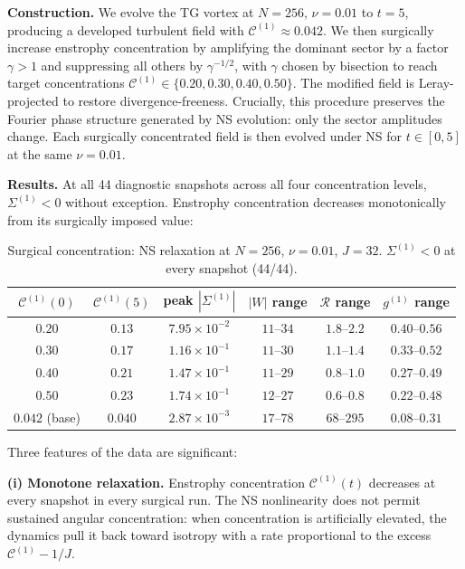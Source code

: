 \documentclass[11pt]{article}
\theoremstyle{definition}
\newcommand{\cC}{\mathcal{C}}
\begin{document}
\medskip\noindent\textbf{Construction.}
We evolve the TG vortex at $N=256$, $\nu=0.01$ to
$t=5$, producing a developed turbulent field with
$\cC^{(1)}\approx 0.042$.  We then surgically
increase enstrophy concentration by amplifying the
dominant sector by a factor $\gamma>1$ and suppressing
all others by $\gamma^{-1/2}$, with $\gamma$ chosen
by bisection to reach target concentrations
$\cC^{(1)}\in\{0.20, 0.30, 0.40, 0.50\}$.  The
modified field is Leray-projected to restore
divergence-freeness.  Crucially, this procedure
preserves the Fourier phase structure generated by
NS evolution: only the sector amplitudes change.
Each surgically concentrated field is then evolved
under NS for $t\in[0,5]$ at the same $\nu=0.01$.

\medskip\noindent\textbf{Results.}
At all 44 diagnostic snapshots across all four
concentration levels, $\Sigma^{(1)}<0$ without
exception.  Enstrophy concentration decreases
monotonically from its surgically imposed value:

\begin{table}[h]
\centering
\caption{Surgical concentration: NS relaxation at
$N=256$, $\nu=0.01$, $J=32$.  $\Sigma^{(1)}<0$ at
every snapshot (44/44).}
\label{tab:surgical}
\begin{tabular}{@{}cccccc@{}}
\toprule
$\cC^{(1)}(0)$ & $\cC^{(1)}(5)$
  & peak $|\Sigma^{(1)}|$
  & $|W|$ range
  & $\mathcal{R}$ range
  & $g^{(1)}$ range \\
\midrule
$0.20$ & $0.13$ & $7.95\times 10^{-2}$
  & $11$--$34$ & $1.8$--$2.2$ & $0.40$--$0.56$ \\
$0.30$ & $0.17$ & $1.16\times 10^{-1}$
  & $11$--$30$ & $1.1$--$1.4$ & $0.33$--$0.52$ \\
$0.40$ & $0.21$ & $1.47\times 10^{-1}$
  & $11$--$29$ & $0.8$--$1.0$ & $0.27$--$0.49$ \\
$0.50$ & $0.23$ & $1.74\times 10^{-1}$
  & $12$--$27$ & $0.6$--$0.8$ & $0.22$--$0.48$ \\
\midrule
$0.042$ (base) & $0.040$ & $2.87\times 10^{-3}$
  & $17$--$78$ & $68$--$295$ & $0.08$--$0.31$ \\
\bottomrule
\end{tabular}
\end{table}

Three features of the data are significant:

\medskip\noindent\textbf{(i) Monotone relaxation.}
Enstrophy concentration $\cC^{(1)}(t)$ decreases at
every snapshot in every surgical run.  The NS
nonlinearity does not permit sustained angular
concentration: when concentration is artificially
elevated, the dynamics pull it back toward isotropy
with a rate proportional to the excess
$\cC^{(1)}-1/J$.
\end{document}
